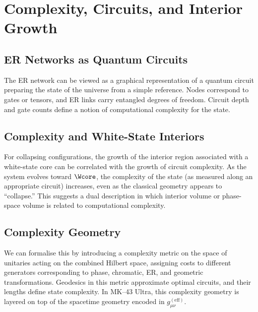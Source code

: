 \chapter{Complexity, Circuits, and Interior Growth}

\section{ER Networks as Quantum Circuits}

The ER network can be viewed as a graphical representation of a quantum circuit preparing the state of the universe from a simple reference.
Nodes correspond to gates or tensors, and ER links carry entangled degrees of freedom.
Circuit depth and gate counts define a notion of computational complexity for the state.

\section{Complexity and White-State Interiors}

For collapsing configurations, the growth of the interior region associated with a white-state core can be correlated with the growth of circuit complexity.
As the system evolves toward $\Wcore$, the complexity of the state (as measured along an appropriate circuit) increases, even as the classical geometry appears to ``collapse.''
This suggests a dual description in which interior volume or phase-space volume is related to computational complexity.

\section{Complexity Geometry}

We can formalise this by introducing a complexity metric on the space of unitaries acting on the combined Hilbert space, assigning costs to different generators corresponding to phase, chromatic, ER, and geometric transformations.
Geodesics in this metric approximate optimal circuits, and their lengths define state complexity.
In MK--43 Ultra, this complexity geometry is layered on top of the spacetime geometry encoded in $g_{\mu\nu}^{\mathrm{(eff)}}$.

